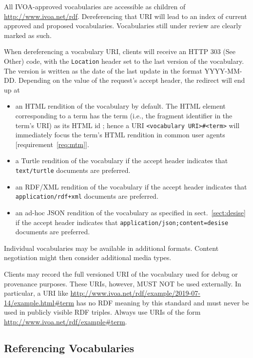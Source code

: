 \documentclass[11pt,a4paper]{ivoa}
\begin{document}
All IVOA-approved vocabularies are accessible as children of
\url{http://www.ivoa.net/rdf}.  Dereferencing that URI will lead to an
index of current approved and proposed vocabularies.
Vocabularies still under review are clearly marked as such.

When dereferencing a vocabulary URI, clients will receive an HTTP 303
(See Other) code, with the \texttt{Location} header set to the last
version of the vocabulary.  The version is written as the date of the
last update in the format YYYY-MM-DD.  Depending on the value of the
request's accept header, the redirect will end up at

\begin{itemize}
\item an HTML rendition of the vocabulary by default.  The HTML element
corresponding to a term has the term (i.e., the fragment identifier in the
term's URI) as its HTML id ; hence a URI
\verb|<vocabulary URI>#<term>| will immediately focus the term's HTML
rendition in common
user agents [requirement~\ref{req:mtm}].

\item a Turtle rendition of the vocabulary if the accept header
indicates that \verb|text/turtle| documents are preferred.

\item an RDF/XML rendition of the vocabulary
if the accept header indicates that
\verb|application/rdf+xml| documents are preferred. 

\item an ad-hoc JSON rendition of the vocabulary as specified in
sect.~\ref{sect:desise} if the accept header indicates that
\verb|application/json;content=desise| documents are preferred.
\end{itemize}

Individual vocabularies may be available in additional formats.
Content negotiation might then consider additional media types.

Clients may record the full versioned URI of the vocabulary used for
debug or provenance purposes.  These URIs, however, MUST NOT be used
externally.  In particular, a URI like
\url{http://www.ivoa.net/rdf/example/2019-07-14/example.html#term} has no
RDF meaning by this standard and must never be used in publicly visible
RDF triples.  Always use URIs of the form
\url{http://www.ivoa.net/rdf/example#term}.

\subsection{Referencing Vocabularies}
\end{document}
